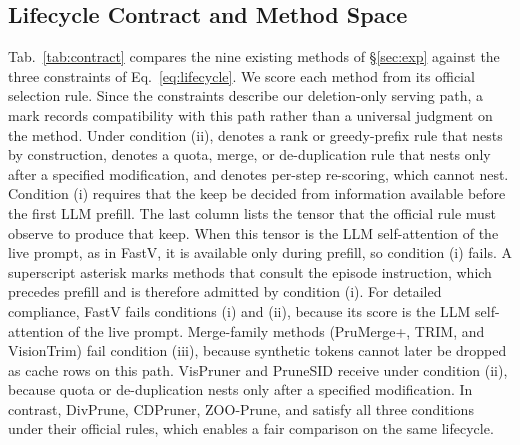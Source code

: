 \subsection{Lifecycle Contract and Method Space}
Tab.~\ref{tab:contract} compares the nine existing methods of \S\ref{sec:exp} against the three constraints of Eq.~\ref{eq:lifecycle}.
%
We score each method from its official selection rule.
%
Since the constraints describe our deletion-only serving path, a mark records compatibility with this path rather than a universal judgment on the method.
%
Under condition (ii), \cmark{} denotes a rank or greedy-prefix rule that nests by construction, \pmark{} denotes a quota, merge, or de-duplication rule that nests only after a specified modification, and \xmark{} denotes per-step re-scoring, which cannot nest.
%
Condition (i) requires that the keep be decided from information available before the first LLM prefill.
%
The last column lists the tensor that the official rule must observe to produce that keep.
%
When this tensor is the LLM self-attention of the live prompt, as in FastV, it is available only during prefill, so condition (i) fails.
%
A superscript asterisk marks methods that consult the episode instruction, which precedes prefill and is therefore admitted by condition (i).
%
For detailed compliance, FastV fails conditions (i) and (ii), because its score is the LLM self-attention of the live prompt.
%
Merge-family methods (PruMerge+, TRIM, and VisionTrim) fail condition (iii), because synthetic tokens cannot later be dropped as cache rows on this path.
%
VisPruner and PruneSID receive \pmark{} under condition (ii), because quota or de-duplication nests only after a specified modification.
%
In contrast, DivPrune, CDPruner, ZOO-Prune, and \method{} satisfy all three conditions under their official rules, which enables a fair comparison on the same lifecycle.


